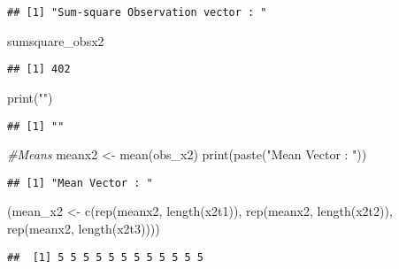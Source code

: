 \documentclass[
]{article}
\newenvironment{Shaded}{\begin{snugshade}}{\end{snugshade}}
\newcommand{\CommentTok}[1]{\textcolor[rgb]{0.56,0.35,0.01}{\textit{#1}}}
\newcommand{\FunctionTok}[1]{\textcolor[rgb]{0.00,0.00,0.00}{#1}}
\newcommand{\NormalTok}[1]{#1}
\newcommand{\OtherTok}[1]{\textcolor[rgb]{0.56,0.35,0.01}{#1}}
\newcommand{\StringTok}[1]{\textcolor[rgb]{0.31,0.60,0.02}{#1}}
\begin{document}
\begin{verbatim}
## [1] "Sum-square Observation vector : "
\end{verbatim}

\begin{Shaded}
\begin{Highlighting}[]
\NormalTok{sumsquare\_obsx2}
\end{Highlighting}
\end{Shaded}

\begin{verbatim}
## [1] 402
\end{verbatim}

\begin{Shaded}
\begin{Highlighting}[]
\FunctionTok{print}\NormalTok{(}\StringTok{""}\NormalTok{)}
\end{Highlighting}
\end{Shaded}

\begin{verbatim}
## [1] ""
\end{verbatim}

\begin{Shaded}
\begin{Highlighting}[]
\CommentTok{\#Means}
\NormalTok{meanx2 }\OtherTok{\textless{}{-}} \FunctionTok{mean}\NormalTok{(obs\_x2)}
\FunctionTok{print}\NormalTok{(}\FunctionTok{paste}\NormalTok{(}\StringTok{"Mean Vector : "}\NormalTok{))}
\end{Highlighting}
\end{Shaded}

\begin{verbatim}
## [1] "Mean Vector : "
\end{verbatim}

\begin{Shaded}
\begin{Highlighting}[]
\NormalTok{(mean\_x2 }\OtherTok{\textless{}{-}} \FunctionTok{c}\NormalTok{(}\FunctionTok{rep}\NormalTok{(meanx2, }\FunctionTok{length}\NormalTok{(x2t1)), }
              \FunctionTok{rep}\NormalTok{(meanx2, }\FunctionTok{length}\NormalTok{(x2t2)), }
              \FunctionTok{rep}\NormalTok{(meanx2, }\FunctionTok{length}\NormalTok{(x2t3))))}
\end{Highlighting}
\end{Shaded}

\begin{verbatim}
##  [1] 5 5 5 5 5 5 5 5 5 5 5 5
\end{verbatim}
\end{document}
